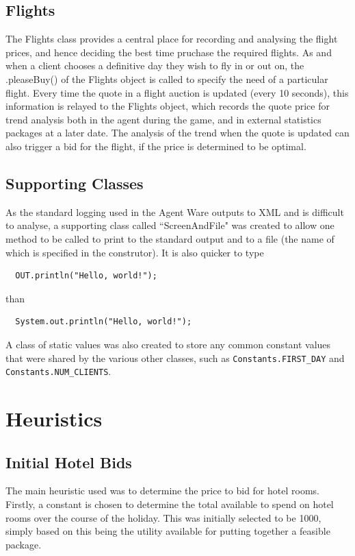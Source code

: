 \documentclass{acm_proc_article-sp}
\begin{document}
  \subsection{Flights}
   The Flights class provides a central place for recording and analysing the flight prices, and hence deciding the best time pruchase the required flights.  As and when a client chooses a definitive day they wish to fly in or out on, the .pleaseBuy() of the Flights object is called to specify the need of a particular flight.  Every time the quote in a flight auction is updated (every 10 seconds), this information is relayed to the Flights object, which records the quote price for trend analysis both in the agent during the game, and in external statistics packages at a later date.  The analysis of the trend when the quote is updated can also trigger a bid for the flight, if the price is determined to be optimal.
   
  \subsection{Supporting Classes}
   As the standard logging used in the Agent Ware outputs to XML and is difficult to analyse, a supporting class called ``ScreenAndFile" was created to allow one method to be called to print to the standard output and to a file (the name of which is specified in the construtor).  It is also quicker to type \begin{verbatim}  OUT.println("Hello, world!");\end{verbatim} than \begin{verbatim}  System.out.println("Hello, world!");\end{verbatim}
   
   A class of static values was also created to store any common constant values that were shared by the various other classes, such as \verb"Constants.FIRST_DAY" and \verb"Constants.NUM_CLIENTS".

\section{Heuristics}
 \label{heurisitics}
 \subsection{Initial Hotel Bids}
  The main heuristic used was to determine the price to bid for hotel rooms.  Firstly, a constant is chosen to determine the total available to spend on hotel rooms over the course of the holiday.  This was initially selected to be 1000, simply based on this being the utility available for putting together a feasible package.
  
\end{document}
